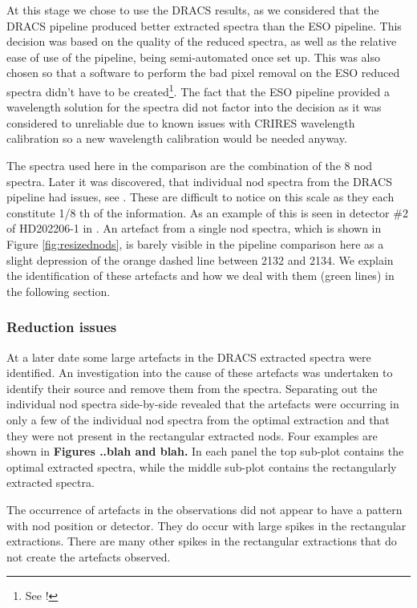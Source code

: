 At this stage we chose to use the DRACS results, as we considered that the DRACS pipeline produced better extracted spectra than the ESO pipeline. This decision was based on the quality of the reduced spectra, as well as the relative ease of use of the pipeline, being semi-automated once set up. This was also chosen so that a software to perform the bad pixel removal on the ESO reduced spectra didn't have to be created\footnote{See !}. The fact that the ESO pipeline provided a wavelength solution for the spectra did not factor into the decision as it was considered to unreliable due to known issues with CRIRES wavelength calibration so a new wavelength calibration would be needed anyway.

The spectra used here in the comparison are the combination of the 8 nod spectra. Later it was discovered, that individual nod spectra from the DRACS pipeline had issues, see . These are difficult to notice on this scale as they each constitute 1/8 th of the information. As an example of this is seen in detector \#2 of HD202206-1 in . An artefact from a single nod spectra, which is shown in Figure \ref{fig:resizednods}, is barely visible in the pipeline comparison here as a slight depression of the orange dashed line between 2132 and 2134\nm{}. We explain the identification of these artefacts and how we deal with them (green lines) in the following section.

\subsubsection{Reduction issues}
\label{subsubsec:reductionartefacts}
At a later date some large artefacts in the DRACS extracted spectra were identified. An investigation into the cause of these artefacts was undertaken to identify their source and remove them from the spectra. Separating out the individual nod spectra side-by-side revealed that the artefacts were occurring in only a few of the individual nod spectra from the optimal extraction and that they were not present in the rectangular extracted nods. Four examples are shown in \textbf{Figures ..blah and blah.} In each panel the top sub-plot contains the optimal extracted spectra, while the middle sub-plot contains the rectangularly extracted spectra.


The occurrence of artefacts in the observations did not appear to have a pattern with nod position or detector. They do occur with large spikes in the rectangular extractions. There are many other spikes in the rectangular extractions that do not create the artefacts observed.

